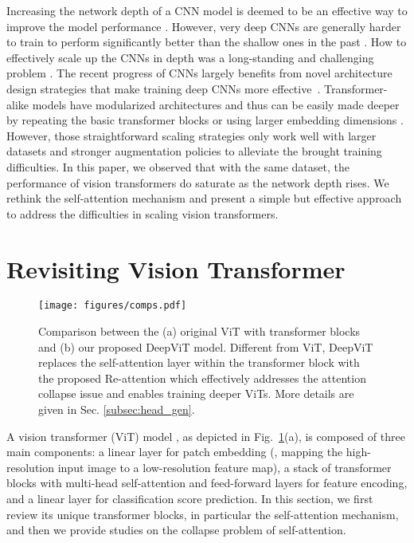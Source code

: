 \documentclass[10pt,twocolumn,letterpaper]{article}
\newcommand{\nameofatten}{Re-attention}
\begin{document}
Increasing the network depth   of a CNN model is deemed to be an effective way to improve the model performance
\cite{simonyan2014very,szegedy2015going,szegedy2016rethinking,he2016identity,huang2017densely}. 
However, very deep CNNs are generally harder to train to perform significantly better   than the shallow ones in the past \cite{glorot2010understanding,zagoruyko2016wide}.  How to effectively scale up the CNNs in depth was a long-standing and challenging problem \cite{huang2018gpipe}. 
The recent progress of CNNs largely benefits from novel architecture design strategies 
that make training deep CNNs more effective~\cite{he2016deep, tan2019efficientnet, howard2019searching, hou2021coordinate, tan2019mixconv,zhou2020rethinking}.
Transformer-alike models have modularized architectures and thus can be easily made deeper by
repeating the basic transformer blocks or
using larger embedding dimensions \cite{brown2020language,lepikhin2020gshard}. However, those straightforward scaling strategies only work well   with larger datasets and stronger augmentation policies \cite{zhong2020random,zhang2017mixup,yun2019cutmix} to alleviate the brought training difficulties.
In this paper, we observed that with the same dataset, 
the performance of vision transformers do saturate as the network depth rises.
We rethink the self-attention mechanism and present a simple but effective approach
to address the difficulties in scaling vision transformers. 


 \section{Revisiting Vision Transformer} \label{sec:revisit_vit}

\begin{figure}[t]
    \centering
    \texttt{[image: figures/comps.pdf]}
\caption{Comparison between the (a) original ViT with  transformer blocks and (b) our proposed DeepViT model. Different from ViT, DeepViT replaces the self-attention layer within  the transformer block  with the proposed \nameofatten{} which effectively addresses the attention collapse issue and enables training deeper ViTs. More details are given in Sec. \ref{subsec:head_gen}.
    }
    \label{fig:diagram}
\end{figure}

A vision transformer (ViT) model \cite{touvron2020training,dosovitskiy2020image}, as depicted in Fig.~\ref{fig:diagram}(a),
is composed of three main components:
a linear layer for patch embedding (\ie, mapping the high-resolution input image
to a low-resolution feature map), a stack of transformer blocks with multi-head self-attention
and feed-forward layers for feature encoding,
and a linear layer for classification score prediction.
In this section, we first review its unique transformer blocks,
in particular the self-attention mechanism, and then we provide studies on 
the collapse problem of self-attention. 
\end{document}
